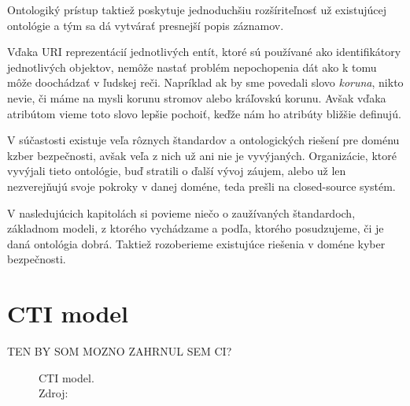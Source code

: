 \documentclass[12pt, a4paper, oneside]{book}
\begin{document}
Ontologiký prístup taktiež poskytuje jednoduchšiu rozšíriteľnosť už existujúcej ontológie a tým sa dá vytvárať presnejší popis záznamov.


Vďaka URI reprezentácií jednotlivých entít, ktoré sú používané ako identifikátory jednotlivých objektov, nemôže nastať problém nepochopenia dát ako k tomu môže doochádzať v ľudskej reči. Napríklad ak by sme povedali slovo \textit{koruna}, nikto nevie, či máme na mysli korunu stromov alebo kráľovskú korunu. Avšak vďaka atribútom vieme toto slovo lepšie pochoiť, keďže nám ho atribúty bližšie definujú.


V súčastosti existuje veľa rôznych štandardov a ontologických riešení pre doménu kzber bezpečnosti, avšak veľa z nich už ani nie je vyvýjaných. Organizácie, ktoré vyvýjali tieto ontológie, buď stratili o ďalší vývoj záujem, alebo už len nezverejňujú svoje pokroky v danej doméne, teda prešli na closed-source systém.


V nasledujúcich kapitolách si povieme niečo o zaužívaných štandardoch, základnom modeli, z ktorého vychádzame a podľa, ktorého posudzujeme, či je daná ontológia dobrá. Taktiež rozoberieme existujúce riešenia v doméne kyber bezpečnosti.

\section{CTI model}
TEN BY SOM MOZNO ZAHRNUL SEM CI? \citep{MavroeidisB17}
\begin{figure}
\label{fig:semantic_web}
\caption{CTI model.\\Zdroj: \citep{MavroeidisB17}}

\end{figure}
\end{document}
